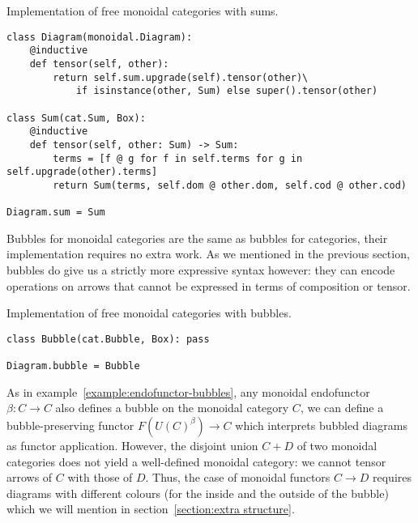 \begin{python}
{\normalfont Implementation of free monoidal categories with sums.}

\begin{verbatim}
class Diagram(monoidal.Diagram):
    @inductive
    def tensor(self, other):
        return self.sum.upgrade(self).tensor(other)\
            if isinstance(other, Sum) else super().tensor(other)

class Sum(cat.Sum, Box):
    @inductive
    def tensor(self, other: Sum) -> Sum:
        terms = [f @ g for f in self.terms for g in self.upgrade(other).terms]
        return Sum(terms, self.dom @ other.dom, self.cod @ other.cod)

Diagram.sum = Sum
\end{verbatim}
\end{python}

Bubbles for monoidal categories are the same as bubbles for categories, their implementation requires no extra work.
As we mentioned in the previous section, bubbles do give us a strictly more expressive syntax however: they can encode operations on arrows that cannot be expressed in terms of composition or tensor.

\begin{python}
{\normalfont Implementation of free monoidal categories with bubbles.}

\begin{verbatim}
class Bubble(cat.Bubble, Box): pass

Diagram.bubble = Bubble
\end{verbatim}
\end{python}

\begin{example}
As in example~\ref{example:endofunctor-bubbles}, any monoidal endofunctor $\beta : C \to C$ also defines a bubble on the monoidal category $C$, we can define a bubble-preserving functor $F(U(C)^\beta) \to C$ which interprets bubbled diagrams as functor application.
However, the disjoint union $C + D$ of two monoidal categories does not yield a well-defined monoidal category: we cannot tensor arrows of $C$ with those of $D$.
Thus, the case of monoidal functors $C \to D$ requires diagrams with different colours (for the inside and the outside of the bubble) which we will mention in section~\ref{section:extra structure}.
\end{example}

